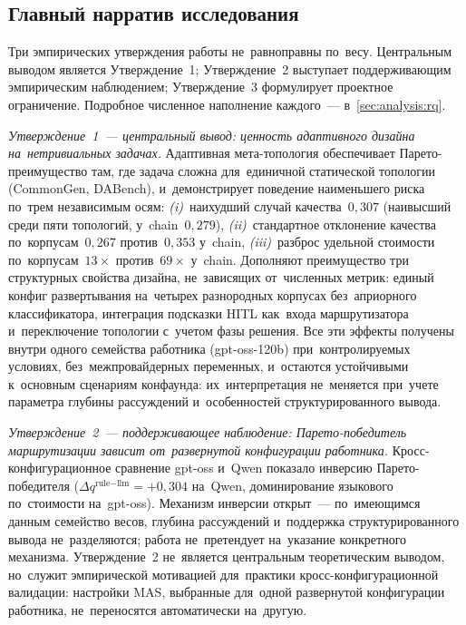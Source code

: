 \subsection{Главный нарратив исследования}
\label{sec:analysis:central}

Три эмпирических утверждения работы не~равноправны по~весу.
Центральным выводом является Утверждение~1; Утверждение~2
выступает поддерживающим эмпирическим наблюдением; Утверждение~3
формулирует проектное ограничение. Подробное численное наполнение
каждого~--- в~\ref{sec:analysis:rq}.

\emph{Утверждение~1~--- центральный вывод: ценность адаптивного
дизайна на~нетривиальных задачах.} Адаптивная мета-топология
обеспечивает Парето-преимущество там, где задача сложна для~единичной
статической топологии (CommonGen, DABench), и~демонстрирует
поведение наименьшего риска по~трем независимым осям:
\textit{(i)}~наихудший случай качества~$0{,}307$ (наивысший среди
пяти топологий, у~chain~$0{,}279$), \textit{(ii)}~стандартное
отклонение качества по~корпусам~$0{,}267$ против~$0{,}353$ у~chain,
\textit{(iii)}~разброс удельной стоимости по~корпусам~$13\times$
против~$69\times$ у~chain. Дополняют преимущество три структурных
свойства дизайна, не~зависящих от~численных метрик: единый конфиг
развертывания на~четырех разнородных корпусах без~априорного
классификатора, интеграция подсказки HITL как~входа маршрутизатора
и~переключение топологии с~учетом фазы решения. Все эти эффекты
получены внутри одного семейства работника (gpt-oss-120b)
при~контролируемых условиях, без~межпровайдерных переменных,
и~остаются устойчивыми к~основным сценариям конфаунда: их~интерпретация
не~меняется при~учете параметра глубины рассуждений и~особенностей
структурированного вывода.

\emph{Утверждение~2~--- поддерживающее наблюдение: Парето-победитель
маршрутизации зависит от~развернутой конфигурации работника.}
Кросс-конфигурационное сравнение gpt-oss и~Qwen показало инверсию
Парето-победителя ($\Delta q^{\text{rule}-\text{llm}}=+0{,}304$
на~Qwen, доминирование языкового по~стоимости на~gpt-oss).
Механизм инверсии открыт~--- по~имеющимся данным семейство весов,
глубина рассуждений и~поддержка структурированного вывода
не~разделяются; работа не~претендует на~указание конкретного
механизма. Утверждение~2 не~является центральным теоретическим
выводом, но~служит эмпирической мотивацией для~практики
кросс-конфигурационной валидации: настройки MAS, выбранные
для~одной развернутой конфигурации работника, не~переносятся
автоматически на~другую.

